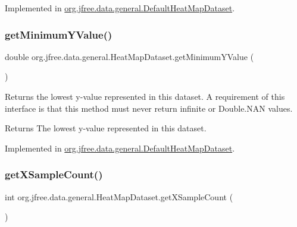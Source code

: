 Implemented in \mbox{\hyperlink{classorg_1_1jfree_1_1data_1_1general_1_1_default_heat_map_dataset_ab15741ca0fcbd1d8224d228aef4a80b2}{org.\+jfree.\+data.\+general.\+Default\+Heat\+Map\+Dataset}}.

\mbox{\label{interfaceorg_1_1jfree_1_1data_1_1general_1_1_heat_map_dataset_ad3b85b7cbe6b7bb308701f5a58613903}} 
\subsubsection{\texorpdfstring{get\+Minimum\+Y\+Value()}{getMinimumYValue()}}
{\footnotesize\ttfamily double org.\+jfree.\+data.\+general.\+Heat\+Map\+Dataset.\+get\+Minimum\+Y\+Value (\begin{DoxyParamCaption}{ }\end{DoxyParamCaption})}

Returns the lowest y-\/value represented in this dataset. A requirement of this interface is that this method must never return infinite or Double.\+N\+AN values.

\begin{DoxyReturn}{Returns}
The lowest y-\/value represented in this dataset. 
\end{DoxyReturn}


Implemented in \mbox{\hyperlink{classorg_1_1jfree_1_1data_1_1general_1_1_default_heat_map_dataset_a668dc2df7c2f9e52f76d076fd1b89cd0}{org.\+jfree.\+data.\+general.\+Default\+Heat\+Map\+Dataset}}.

\mbox{\label{interfaceorg_1_1jfree_1_1data_1_1general_1_1_heat_map_dataset_ada47a69a69c446d7f519d6bf05a47f6f}} 
\subsubsection{\texorpdfstring{get\+X\+Sample\+Count()}{getXSampleCount()}}
{\footnotesize\ttfamily int org.\+jfree.\+data.\+general.\+Heat\+Map\+Dataset.\+get\+X\+Sample\+Count (\begin{DoxyParamCaption}{ }\end{DoxyParamCaption})}


